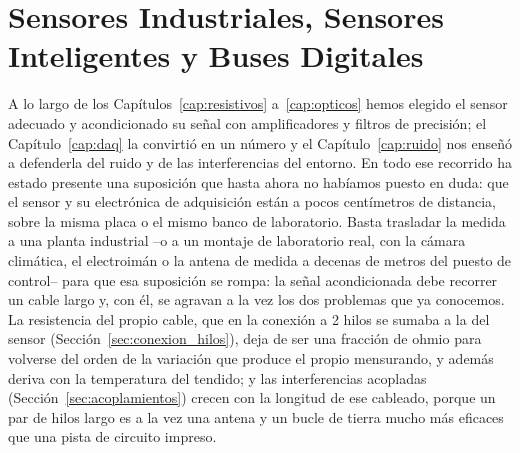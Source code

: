 

\chapter{Sensores Industriales, Sensores Inteligentes y Buses Digitales}\label{cap:buses}

A lo largo de los Capítulos~\ref{cap:resistivos} a~\ref{cap:opticos} hemos elegido el sensor adecuado y acondicionado su señal con amplificadores y filtros de precisión; el Capítulo~\ref{cap:daq} la convirtió en un número y el Capítulo~\ref{cap:ruido} nos enseñó a defenderla del ruido y de las interferencias del entorno. En todo ese recorrido ha estado presente una suposición que hasta ahora no habíamos puesto en duda: que el sensor y su electrónica de adquisición están a pocos centímetros de distancia, sobre la misma placa o el mismo banco de laboratorio. Basta trasladar la medida a una planta industrial --o a un montaje de laboratorio real, con la cámara climática, el electroimán o la antena de medida a decenas de metros del puesto de control-- para que esa suposición se rompa: la señal acondicionada debe recorrer un cable largo y, con él, se agravan a la vez los dos problemas que ya conocemos. La resistencia del propio cable, que en la conexión a 2 hilos se sumaba a la del sensor (Sección~\ref{sec:conexion_hilos}), deja de ser una fracción de ohmio para volverse del orden de la variación que produce el propio mensurando, y además deriva con la temperatura del tendido; y las interferencias acopladas (Sección~\ref{sec:acoplamientos}) crecen con la longitud de ese cableado, porque un par de hilos largo es a la vez una antena y un bucle de tierra mucho más eficaces que una pista de circuito impreso.

